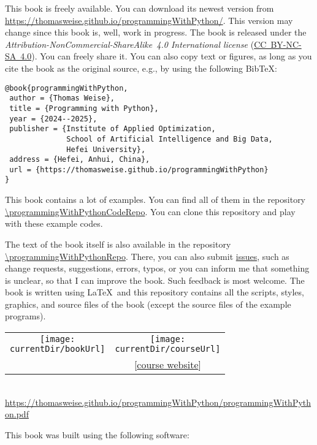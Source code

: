 This book is freely available.
You can download its newest version from \url{https://thomasweise.github.io/programmingWithPython/}.
This version may change since this book is, well, work in progress.
The book is released under the \emph{Attribution-NonCommercial-ShareAlike~4.0 International license} (\href{http://creativecommons.org/licenses/by-nc-sa/4.0/}{\mbox{CC~BY-NC-SA~4.0}}).
You can freely share it.
You can also copy text or figures, as long as you cite the book as the original source, e.g., by using the following Bib\TeX:%
%
\begin{lstlisting}[style=text_style]
@book{programmingWithPython,
 author = {Thomas Weise},
 title = {Programming with Python},
 year = {2024--2025},
 publisher = {Institute of Applied Optimization,
              School of Artificial Intelligence and Big Data,
              Hefei University},
 address = {Hefei, Anhui, China},
 url = {https://thomasweise.github.io/programmingWithPython}
}
\end{lstlisting}
%
This book contains a lot of examples.
You can find all of them in the repository \url{\programmingWithPythonCodeRepo}.
You can clone this repository and play with these example codes.%
%
\begin{sloppypar}%
The text of the book itself is also available in the repository \url{\programmingWithPythonRepo}.
There, you can also submit \href{\programmingWithPythonRepo/issues}{issues}, such as change requests, suggestions, errors, typos, or you can inform me that something is unclear, so that I can improve the book.
Such feedback is most welcome.
The book is written using \LaTeX\ and this repository contains all the scripts, styles, graphics, and source files of the book (except the source files of the example programs).%
\end{sloppypar}%
%
\strut\vfill\strut%
%
%
%
\clearpage%
%
\strut\vfill\strut%
%
\begin{center}%
\begin{tabular}{c@{~~~~~~~~~~~~}c}%
\texttt{[image: \\currentDir/bookUrl]}&\texttt{[image: \\currentDir/courseUrl]}\\\relax%
[\href{https://thomasweise.github.io/programmingWithPython/programmingWithPython.pdf}{book pdf}]&[\href{https://thomasweise.github.io/programmingWithPython}{course website}]\\%
\end{tabular}\\[12pt]%
\url{https://thomasweise.github.io/programmingWithPython/programmingWithPython.pdf}%
\end{center}%
%
\strut\vfill\strut%
This book was built using the following software:%
%
